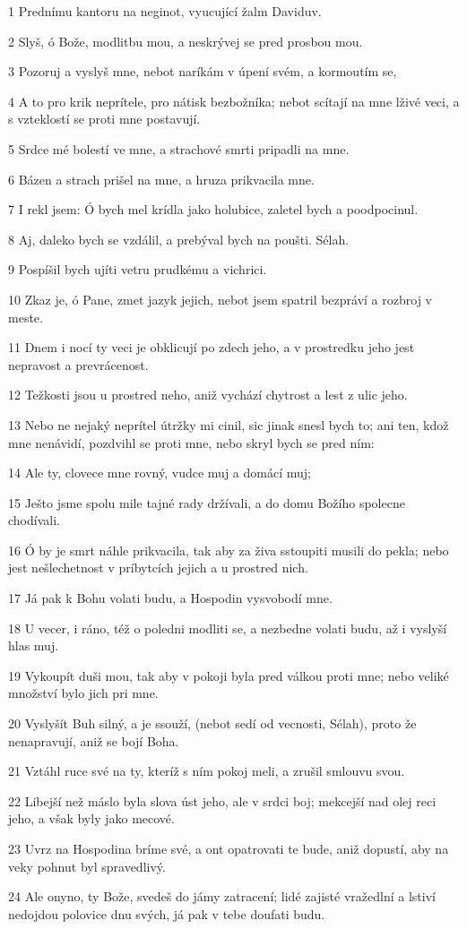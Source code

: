 \par 1 Prednímu kantoru na neginot, vyucující žalm Daviduv.
\par 2 Slyš, ó Bože, modlitbu mou, a neskrývej se pred prosbou mou.
\par 3 Pozoruj a vyslyš mne, nebot naríkám v úpení svém, a kormoutím se,
\par 4 A to pro krik neprítele, pro nátisk bezbožníka; nebot scítají na mne lživé veci, a s vzteklostí se proti mne postavují.
\par 5 Srdce mé bolestí ve mne, a strachové smrti pripadli na mne.
\par 6 Bázen a strach prišel na mne, a hruza prikvacila mne.
\par 7 I rekl jsem: Ó bych mel krídla jako holubice, zaletel bych a poodpocinul.
\par 8 Aj, daleko bych se vzdálil, a prebýval bych na poušti. Sélah.
\par 9 Pospíšil bych ujíti vetru prudkému a vichrici.
\par 10 Zkaz je, ó Pane, zmet jazyk jejich, nebot jsem spatril bezpráví a rozbroj v meste.
\par 11 Dnem i nocí ty veci je obklicují po zdech jeho, a v prostredku jeho jest nepravost a prevrácenost.
\par 12 Težkosti jsou u prostred neho, aniž vychází chytrost a lest z ulic jeho.
\par 13 Nebo ne nejaký neprítel útržky mi cinil, sic jinak snesl bych to; ani ten, kdož mne nenávidí, pozdvihl se proti mne, nebo skryl bych se pred ním:
\par 14 Ale ty, clovece mne rovný, vudce muj a domácí muj;
\par 15 Ješto jsme spolu mile tajné rady držívali, a do domu Božího spolecne chodívali.
\par 16 Ó by je smrt náhle prikvacila, tak aby za živa sstoupiti musili do pekla; nebo jest nešlechetnost v príbytcích jejich a u prostred nich.
\par 17 Já pak k Bohu volati budu, a Hospodin vysvobodí mne.
\par 18 U vecer, i ráno, též o poledni modliti se, a nezbedne volati budu, až i vyslyší hlas muj.
\par 19 Vykoupít duši mou, tak aby v pokoji byla pred válkou proti mne; nebo veliké množství bylo jich pri mne.
\par 20 Vyslyšít Buh silný, a je ssouží, (nebot sedí od vecnosti, Sélah), proto že nenapravují, aniž se bojí Boha.
\par 21 Vztáhl ruce své na ty, kteríž s ním pokoj meli, a zrušil smlouvu svou.
\par 22 Libejší než máslo byla slova úst jeho, ale v srdci boj; mekcejší nad olej reci jeho, a však byly jako mecové.
\par 23 Uvrz na Hospodina bríme své, a ont opatrovati te bude, aniž dopustí, aby na veky pohnut byl spravedlivý.
\par 24 Ale onyno, ty Bože, svedeš do jámy zatracení; lidé zajisté vražedlní a lstiví nedojdou polovice dnu svých, já pak v tebe doufati budu.

